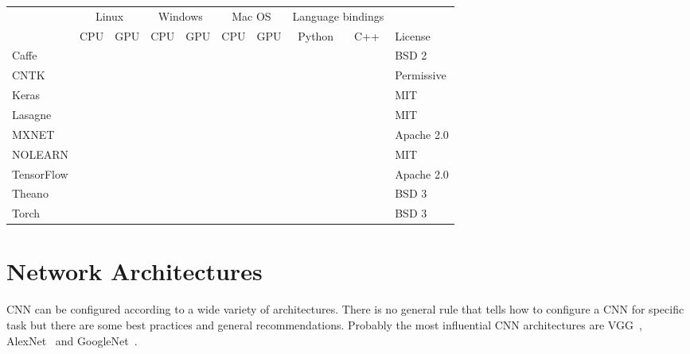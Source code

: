 \documentclass[a4paper, 11pt, table]{article}
\newcommand{\cmark}{\ding{51}}%
\newcommand{\xmark}{\ding{55}}%
\newcommand{\ymark}{\textcolor{clyes}{\cmark}}%
\newcommand{\nmark}{\textcolor{clno}{\xmark}}%
\begin{document}
\begin{landscape}
\begin{center}
\label{tbl:comparison_of_dl_lib}
\begin{tabular}{lccccccccl}
\hline 
 & \multicolumn{2}{c}{\cellcolor{linux}Linux} & \multicolumn{2}{c}{\cellcolor{windows}Windows} & \multicolumn{2}{c}{\cellcolor{macos}Mac OS} & \multicolumn{2}{c}{Language bindings} &  \\ 
 & \cellcolor{linux}CPU & \cellcolor{linux}GPU & \cellcolor{windows}CPU & \cellcolor{windows}GPU & \cellcolor{macos}CPU & \cellcolor{macos}GPU & Python & C++ & License\\ 
\hline 
Caffe & \ymark & \ymark & \ymark & \ymark & \ymark & \ymark & \ymark & \nmark & BSD 2\\ 
CNTK & \ymark & \ymark & \ymark & \ymark & \nmark & \nmark & \ymark & \ymark & Permissive \\ 
Keras & \ymark & \ymark & \ymark & \ymark & \ymark & \ymark & \ymark & \nmark & MIT \\ 
Lasagne & \ymark & \ymark & \ymark & \ymark & \ymark & \ymark & \ymark & \nmark & MIT \\ 
MXNET & \ymark & \ymark & \ymark & \ymark & \ymark & \ymark & \ymark & \ymark & Apache 2.0 \\ 
NOLEARN & \ymark & \ymark & \ymark & \ymark & \ymark & \ymark & \ymark & \nmark & MIT \\ 
TensorFlow & \ymark & \ymark & \nmark & \nmark & \ymark & \nmark & \ymark & \ymark & Apache 2.0 \\ 
Theano & \ymark & \ymark & \ymark & \ymark & \ymark & \ymark & \ymark & \nmark & BSD 3\\ 
Torch & \ymark & \ymark & \ymark & \ymark & \ymark & \ymark & \nmark & \ymark & BSD 3\\ 
\end{tabular} 
\end{center}


\end{landscape}

\section{Network Architectures}

CNN can be configured according to a wide variety of architectures. There is no general rule that tells how to configure a CNN for specific task but there are some best practices and general recommendations. Probably the most influential CNN architectures are VGG~\cite{DBLP:journals/corr/SimonyanZ14a}, AlexNet~\cite{NIPS2012_4824} and GoogleNet~\cite{DBLP:journals/corr/SzegedyLJSRAEVR14}.
\end{document}
